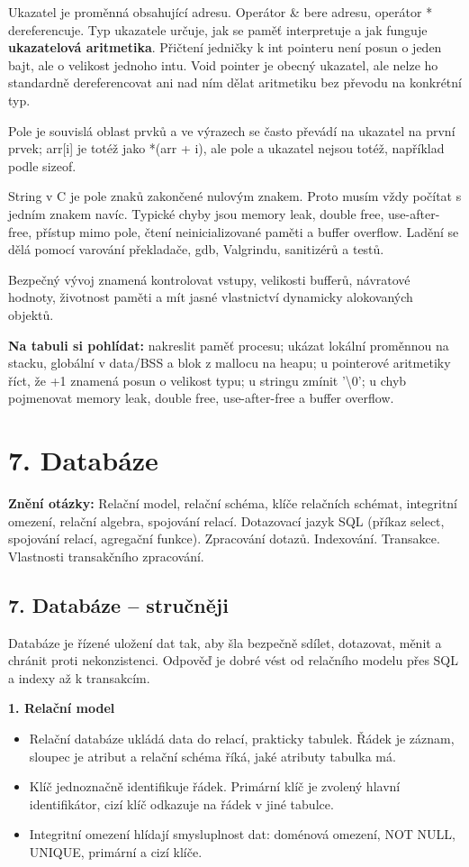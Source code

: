 \documentclass[11pt,a4paper]{article}
\newcommand{\otazka}[3]{\section*{#1}\addcontentsline{toc}{section}{#1}\noindent\textbf{Znění otázky:} #2\par\medskip}
\newcommand{\itpr}[1]{\medskip\noindent\colorbox{green!8}{\parbox{\dimexpr\linewidth-2\fboxsep}{#1}}\medskip}
\begin{document}
Ukazatel je proměnná obsahující adresu. Operátor \& bere adresu, operátor * dereferencuje. Typ ukazatele určuje, jak se paměť interpretuje a jak funguje \textbf{ukazatelová aritmetika}. Přičtení jedničky k int pointeru není posun o jeden bajt, ale o velikost jednoho intu. Void pointer je obecný ukazatel, ale nelze ho standardně dereferencovat ani nad ním dělat aritmetiku bez převodu na konkrétní typ.

Pole je souvislá oblast prvků a ve výrazech se často převádí na ukazatel na první prvek; arr[i] je totéž jako *(arr + i), ale pole a ukazatel nejsou totéž, například podle sizeof.

String v C je pole znaků zakončené nulovým znakem. Proto musím vždy počítat s jedním znakem navíc. Typické chyby jsou memory leak, double free, use-after-free, přístup mimo pole, čtení neinicializované paměti a buffer overflow. Ladění se dělá pomocí varování překladače, gdb, Valgrindu, sanitizérů a testů.

Bezpečný vývoj znamená kontrolovat vstupy, velikosti bufferů, návratové hodnoty, životnost paměti a mít jasné vlastnictví dynamicky alokovaných objektů.

\itpr{\textbf{Na tabuli si pohlídat:} nakreslit paměť procesu; ukázat lokální proměnnou na stacku, globální v data/BSS a blok z mallocu na heapu; u pointerové aritmetiky říct, že +1 znamená posun o velikost typu; u stringu zmínit '\textbackslash{}0'; u chyb pojmenovat memory leak, double free, use-after-free a buffer overflow.}

\newpage

\otazka{7. Databáze}{Relační model, relační schéma, klíče relačních schémat, integritní omezení, relační algebra, spojování relací. Dotazovací jazyk SQL (příkaz select, spojování relací, agregační funkce). Zpracování dotazů. Indexování. Transakce. Vlastnosti transakčního zpracování.}{PB154 || PB168}

\subsection*{7. Databáze -- stručněji}
Databáze je řízené uložení dat tak, aby šla bezpečně sdílet, dotazovat, měnit a chránit proti nekonzistenci. Odpověď je dobré vést od relačního modelu přes SQL a indexy až k transakcím.

\textbf{1. Relační model}
\begin{itemize}
  \item Relační databáze ukládá data do relací, prakticky tabulek. Řádek je záznam, sloupec je atribut a relační schéma říká, jaké atributy tabulka má.
  \item Klíč jednoznačně identifikuje řádek. Primární klíč je zvolený hlavní identifikátor, cizí klíč odkazuje na řádek v jiné tabulce.
  \item Integritní omezení hlídají smysluplnost dat: doménová omezení, NOT NULL, UNIQUE, primární a cizí klíče.
\end{itemize}
\end{document}
